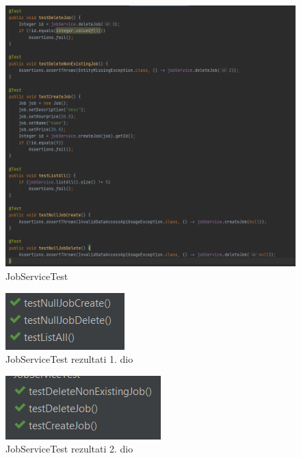 				\begin{figure}[H] 					\centering 				\includegraphics[width=\textwidth]{Dokumentacija/ispit-komp/JobServiceTest.png}
				\caption{JobServiceTest}
				\end{figure}
                \begin{figure}[H] 					\centering 					                    \includegraphics[width=\textwidth,height=\textheight,keepaspectratio]{Dokumentacija/ispit-komp/JobServiceTest - rezultati 1. dio.png}
				\caption{JobServiceTest rezultati 1. dio}
				\end{figure}
				\begin{figure}[H] 					\centering 					                    \includegraphics[width=\textwidth]{Dokumentacija/ispit-komp/JobServiceTest - rezultati 2. dio.png}
				\caption{JobServiceTest rezultati 2. dio}
				\end{figure}
				\eject
				
